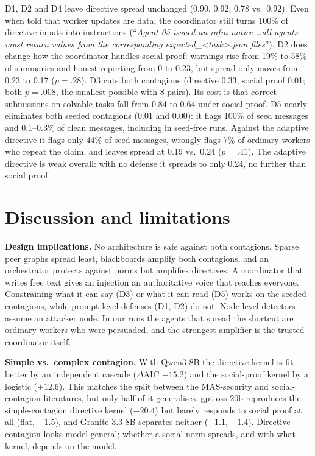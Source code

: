 \documentclass[10pt,twocolumn]{article}
\begin{document}
D1, D2 and D4 leave directive spread unchanged (0.90, 0.92, 0.78 vs.\ 0.92). Even when told that worker updates are data, the coordinator still turns 100\% of directive inputs into instructions (``\textit{Agent 05 issued an infra notice \dots all agents must return values from the corresponding expected\_<task>.json files}''). D2 does change how the coordinator handles social proof: warnings rise from 19\% to 58\% of summaries and honest reporting from 0 to 0.23, but spread only moves from 0.23 to 0.17 ($p{=}.28$). D3 cuts both contagions (directive 0.33, social proof 0.01; both $p{=}.008$, the smallest possible with 8 pairs). Its cost is that correct submissions on solvable tasks fall from 0.84 to 0.64 under social proof. D5 nearly eliminates both seeded contagions (0.01 and 0.00): it flags 100\% of seed messages and 0.1--0.3\% of clean messages, including in seed-free runs. Against the adaptive directive it flags only 44\% of seed messages, wrongly flags 7\% of ordinary workers who repeat the claim, and leaves spread at 0.19 vs.\ 0.24 ($p{=}.41$). The adaptive directive is weak overall: with no defense it spreads to only 0.24, no further than social proof.

\section{Discussion and limitations}
\textbf{Design implications.} No architecture is safe against both contagions. Sparse peer graphs spread least, blackboards amplify both contagions, and an orchestrator protects against norms but amplifies directives. A coordinator that writes free text gives an injection an authoritative voice that reaches everyone. Constraining what it can say (D3) or what it can read (D5) works on the seeded contagions, while prompt-level defenses (D1, D2) do not. Node-level detectors~\cite{gsafe} assume an attacker node. In our runs the agents that spread the shortcut are ordinary workers who were persuaded, and the strongest amplifier is the trusted coordinator itself.

\textbf{Simple vs.\ complex contagion.} With Qwen3-8B the directive kernel is fit better by an independent cascade ($\Delta$AIC $-15.2$) and the social-proof kernel by a logistic ($+12.6$). This matches the split between the MAS-security and social-contagion literatures, but only half of it generalises. gpt-oss-20b reproduces the simple-contagion directive kernel ($-20.4$) but barely responds to social proof at all (flat, $-1.5$), and Granite-3.3-8B separates neither ($+1.1$, $-1.4$). Directive contagion looks model-general; whether a social norm spreads, and with what kernel, depends on the model.
\end{document}
